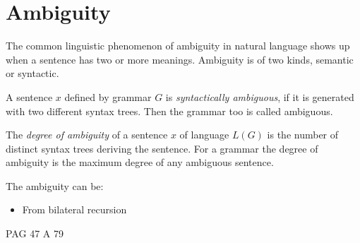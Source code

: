 \section{Ambiguity}

The common linguistic phenomenon of ambiguity in natural language shows up when a sentence has two or more meanings. Ambiguity is of two kinds, semantic or syntactic.
\begin{definition}
    A sentence $x$ defined by grammar $G$ is \emph{syntactically ambiguous}, if it is generated with two different syntax trees. Then the grammar too is called ambiguous.

    The \emph{degree of ambiguity} of a sentence $x$ of  language $L(G)$ is the number of distinct syntax trees deriving the sentence. For a grammar the degree of ambiguity is the maximum degree of 
    any ambiguous sentence.
\end{definition}
The ambiguity can be: 
\begin{itemize}
    \item From bilateral recursion
\end{itemize}


PAG 47 A 79